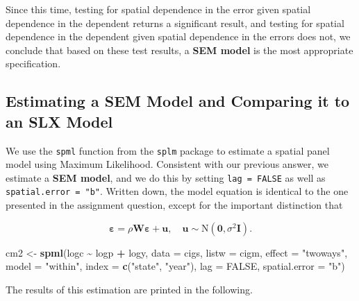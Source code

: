 \documentclass[
  a4paper,
]{article}
\newenvironment{Shaded}{\begin{snugshade}}{\end{snugshade}}
\newcommand{\AttributeTok}[1]{\textcolor[rgb]{0.13,0.29,0.53}{#1}}
\newcommand{\ConstantTok}[1]{\textcolor[rgb]{0.56,0.35,0.01}{#1}}
\newcommand{\FunctionTok}[1]{\textcolor[rgb]{0.13,0.29,0.53}{\textbf{#1}}}
\newcommand{\NormalTok}[1]{#1}
\newcommand{\OtherTok}[1]{\textcolor[rgb]{0.56,0.35,0.01}{#1}}
\newcommand{\SpecialCharTok}[1]{\textcolor[rgb]{0.81,0.36,0.00}{\textbf{#1}}}
\newcommand{\StringTok}[1]{\textcolor[rgb]{0.31,0.60,0.02}{#1}}
\begin{document}
Since this time, testing for spatial dependence in the error given
spatial dependence in the dependent returns a significant result, and
testing for spatial dependence in the dependent given spatial dependence
in the errors does not, we conclude that based on these test results, a
\textbf{SEM model} is the most appropriate specification.

\hypertarget{estimating-a-sem-model-and-comparing-it-to-an-slx-model}{%
\subsection{Estimating a SEM Model and Comparing it to an SLX
Model}\label{estimating-a-sem-model-and-comparing-it-to-an-slx-model}}

We use the \texttt{spml} function from the \texttt{splm} package to
estimate a spatial panel model using Maximum Likelihood. Consistent with
our previous answer, we estimate a \textbf{SEM model}, and we do this by
setting \texttt{lag\ =\ FALSE} as well as
\texttt{spatial.error\ =\ "b"}. Written down, the model equation is
identical to the one presented in the assignment question, except for
the important distinction that

\[
\bm{\varepsilon} = \rho\bm{W\varepsilon} + \bm{u},\quad\bm{u}\sim\mathrm{N}(\bm{0},\sigma^2\bm{I}).
\]

\begin{Shaded}
\begin{Highlighting}[]
\NormalTok{cm2 }\OtherTok{\textless{}{-}} \FunctionTok{spml}\NormalTok{(logc }\SpecialCharTok{\textasciitilde{}}\NormalTok{ logp }\SpecialCharTok{+}\NormalTok{ logy, }\AttributeTok{data =}\NormalTok{ cigs, }\AttributeTok{listw =}\NormalTok{ cigm, }\AttributeTok{effect =} \StringTok{"twoways"}\NormalTok{, }\AttributeTok{model =} \StringTok{"within"}\NormalTok{,}
    \AttributeTok{index =} \FunctionTok{c}\NormalTok{(}\StringTok{"state"}\NormalTok{, }\StringTok{"year"}\NormalTok{), }\AttributeTok{lag =} \ConstantTok{FALSE}\NormalTok{, }\AttributeTok{spatial.error =} \StringTok{"b"}\NormalTok{)}
\end{Highlighting}
\end{Shaded}

The results of this estimation are printed in the following.
\end{document}
